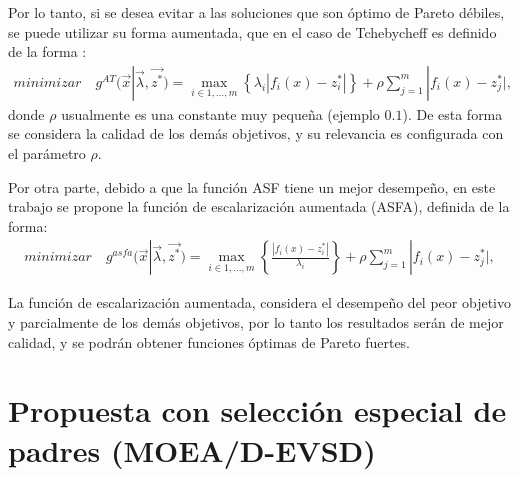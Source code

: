 Por lo tanto, si se desea evitar a las soluciones que son óptimo de Pareto débiles, se puede utilizar su forma aumentada, que en el caso de Tchebycheff es definido de la forma \citep{ishibuchi2010simultaneous, derbel2014impact}:
\begin{equation}
\label{eqn:Tch_augmented}
\begin{split}
minimizar \quad g^{AT}( \vec{x} | \vec{\lambda}, \vec{z^*} ) = \max\limits_{i \in {1,...,m}} \left \{ \lambda_i | f_i(x) - z^*_i|   \right \} + \rho \sum_{j=1}^m |f_i(x) - z_j^*|,
\end{split}
\end{equation}
donde $\rho$ usualmente es una constante muy pequeña (ejemplo $0.1$).
%
De esta forma se considera la calidad de los demás objetivos, y su relevancia es configurada con el parámetro $\rho$.
%

Por otra parte, debido a que la función ASF tiene un mejor desempeño, en este trabajo se propone la función de escalarización aumentada (ASFA), definida de la forma:
\begin{equation}
\label{eqn:ASF_augmented}
\begin{split}
minimizar \quad g^{asfa}( \vec{x} | \vec{\lambda}, \vec{z^*} ) = \max\limits_{i \in {1,...,m}} \left \{  \frac{ | f_i(x) - z^*_i|}{\lambda_i}   \right \} + \rho \sum_{j=1}^m |f_i(x) - z_j^*|,
\end{split}
\end{equation}

La función de escalarización aumentada, considera el desempeño del peor objetivo y parcialmente de los demás objetivos, por lo tanto los resultados serán de mejor calidad, y se podrán obtener funciones óptimas de Pareto fuertes.

\section{Propuesta con selección especial de padres (MOEA/D-EVSD)}


